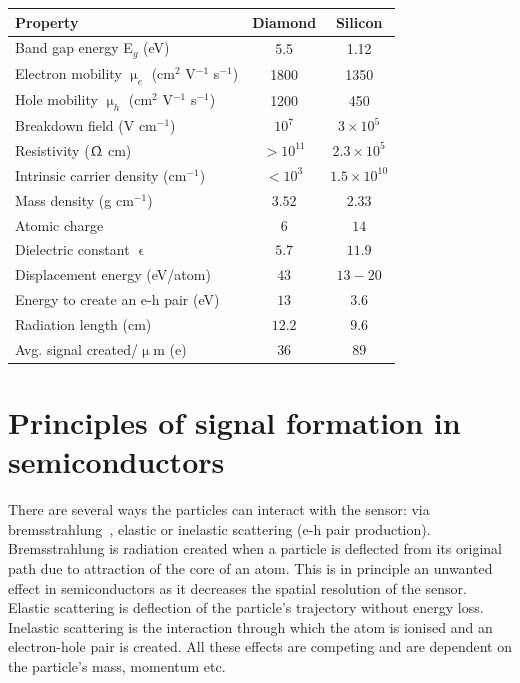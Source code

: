 \documentclass[12pt]{mytustyle}  %
\begin{document}
\begin{footnotesize}
\begin{center}
\begin{tabular}{   l  c  c   }
\hline
Property & Diamond & Silicon \\
\hline
Band gap energy E$_g$ (eV) & 5.5 & 1.12  \\
Electron mobility $\upmu_e$ (cm$^2$ V$^{-1}$ s$^{-1}$) & 1800 & 1350 \\
Hole mobility $\upmu_h$ (cm$^2$ V$^{-1}$ s$^{-1}$) & 1200 & 450 \\
Breakdown field (V cm$^{-1}$) & $10^{7}$ & $3\times 10^5$ \\
Resistivity ($\Upomega$ cm) & $>10^{11}$  & $2.3\times 10^5$  \\
Intrinsic carrier density (cm$^{-1}$) & $<10^3$ & $1.5\times 10^{10} $ \\
Mass density (g cm$^{-1}$) & $ 3.52$ & $2.33 $ \\
Atomic charge  & $6 $ & $ 14$ \\
Dielectric constant $\upvarepsilon$ & $5.7 $ & $11.9 $ \\
Displacement energy (eV/atom) & $43 $ & $13-20 $ \\
Energy to create an e-h pair  (eV) & $13 $ & $ 3.6$ \\
Radiation length (cm) & $ 12.2$ & $9.6 $ \\
Avg. signal created/$\upmu$m (e) & 36 & 89 \\\hline
\end{tabular}
\label{tab:semicompare}
\end{center}
\end{footnotesize}


\section{Principles of signal formation in semiconductors}
\label{sec:princsigfor}
There are several ways the particles can interact with the sensor: via bremsstrahlung~\cite{}, elastic or inelastic scattering (e-h pair production). Bremsstrahlung is radiation created when a particle is deflected from its original path due to attraction of the core of an atom. This is in principle an unwanted effect in semiconductors as it decreases the spatial resolution of the sensor. Elastic scattering is deflection of the particle's trajectory without energy loss. Inelastic scattering is the interaction through which the atom is ionised and an electron-hole pair is created. All these effects are competing and are dependent on the particle's mass, momentum etc. 
\end{document}
